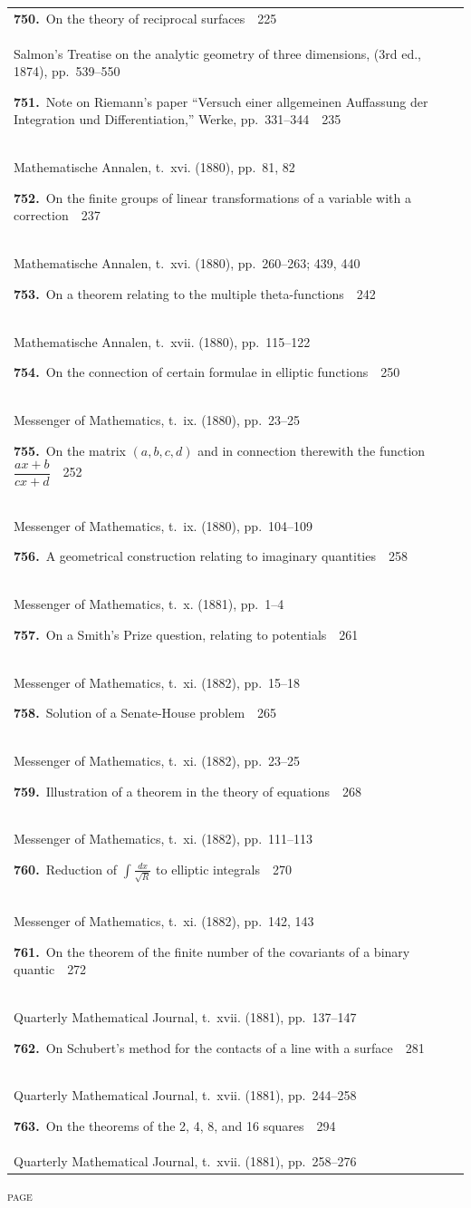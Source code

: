 \documentclass[11pt,a4paper]{book}
\newcommand{\paperentry}[4]{%
  \noindent\textbf{#1.}\ {#2}\ \dotfill\ {#3}\\[-0.2em]%
  {\small #4}\par\vspace{0.6em}%
}
\begin{document}
\begin{center}
\begin{tabular}{p{4.2in}r}
\paperentry{750}{On the theory of reciprocal surfaces}{225}{Salmon's Treatise on the analytic geometry of three dimensions, (3rd ed., 1874), pp.~539--550}
\paperentry{751}{Note on Riemann's paper ``Versuch einer allgemeinen Auffassung der Integration und Differentiation,'' Werke, pp.~331--344}{235}{Mathematische Annalen, t.~xvi. (1880), pp.~81, 82}
\paperentry{752}{On the finite groups of linear transformations of a variable with a correction}{237}{Mathematische Annalen, t.~xvi. (1880), pp.~260--263; 439, 440}
\paperentry{753}{On a theorem relating to the multiple theta-functions}{242}{Mathematische Annalen, t.~xvii. (1880), pp.~115--122}
\paperentry{754}{On the connection of certain formulae in elliptic functions}{250}{Messenger of Mathematics, t.~ix. (1880), pp.~23--25}
\paperentry{755}{On the matrix $(a, b, c, d)$ and in connection therewith the function $\dfrac{ax + b}{cx + d}$}{252}{Messenger of Mathematics, t.~ix. (1880), pp.~104--109}
\paperentry{756}{A geometrical construction relating to imaginary quantities}{258}{Messenger of Mathematics, t.~x. (1881), pp.~1--4}
\paperentry{757}{On a Smith's Prize question, relating to potentials}{261}{Messenger of Mathematics, t.~xi. (1882), pp.~15--18}
\paperentry{758}{Solution of a Senate-House problem}{265}{Messenger of Mathematics, t.~xi. (1882), pp.~23--25}
\paperentry{759}{Illustration of a theorem in the theory of equations}{268}{Messenger of Mathematics, t.~xi. (1882), pp.~111--113}
\paperentry{760}{Reduction of $\displaystyle\int \frac{dx}{\sqrt{R}}$ to elliptic integrals}{270}{Messenger of Mathematics, t.~xi. (1882), pp.~142, 143}
\paperentry{761}{On the theorem of the finite number of the covariants of a binary quantic}{272}{Quarterly Mathematical Journal, t.~xvii. (1881), pp.~137--147}
\paperentry{762}{On Schubert's method for the contacts of a line with a surface}{281}{Quarterly Mathematical Journal, t.~xvii. (1881), pp.~244--258}
\paperentry{763}{On the theorems of the 2, 4, 8, and 16 squares}{294}{Quarterly Mathematical Journal, t.~xvii. (1881), pp.~258--276}
\end{tabular}
\end{center}

\newpage
\thispagestyle{fancy}
\begin{center}
{\small\textsc{page}}
\end{center}
\vspace{-0.5em}
\end{document}
